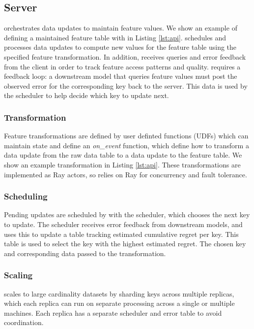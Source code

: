 %
%
\subsection{\system{} Server}
\system{} orchestrates data updates to maintain feature values. We show an example of defining a maintained feature table with \system{} in Listing \ref{lst:api}. 
\system{} schedules and processes data updates to compute new values for the feature table using the specified feature transformation. In addition, \system{} receives queries and error feedback from the client in order to track feature access patterns and quality. \system{} requires a feedback loop: a downstream model that queries feature values must post the observed error for the corresponding key back to the server. This data is used by the scheduler to help decide which key to update next.


\subsubsection{Transformation}
Feature transformations are defined by user definted functions (UDFs) which can maintain state and define an \textit{on\_event} function, which define how to transform a data update from the raw data table to a data update to the feature table. We show an example transformation in Listing \ref{lst:api}. These transformations are implemented as Ray actors, so \system{} relies on Ray for concurrency and fault tolerance.

\subsubsection{Scheduling}
Pending updates are scheduled by \system{} with the scheduler, which chooses the next key to update. The scheduler receives error feedback from downstream models, and uses this to update a table tracking estimated cumulative regret per key. This table is used to select the key with the highest estimated regret. 
The chosen key and corresponding data passed to the transformation.

\subsubsection{Scaling}
\system{} scales to large cardinality datasets by sharding keys across multiple replicas, which each replica can run on separate processing across a single or multiple machines. Each replica has a separate scheduler and error table to avoid coordination.  


